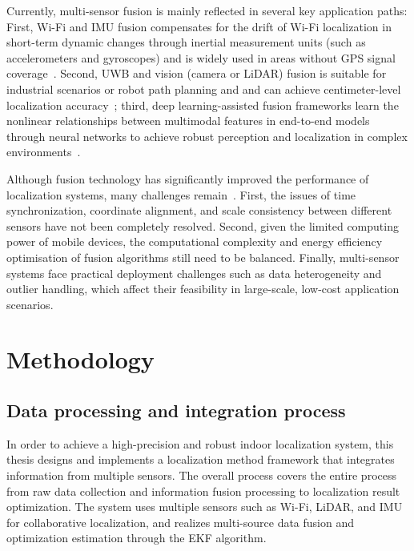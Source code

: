\documentclass[12pt,a4paper]{article}
\numberwithin{equation}{section}
\begin{document}
Currently, multi-sensor fusion is mainly reflected in several key application
paths: First, Wi-Fi and IMU fusion compensates for the drift of Wi-Fi
localization in short-term dynamic changes through inertial measurement units
(such as accelerometers and gyroscopes) and is widely used in areas without GPS
signal coverage~\cite{liu2019fusion}. Second, UWB and vision (camera or LiDAR)
fusion is suitable for industrial scenarios or robot path planning and and can
achieve centimeter-level localization accuracy~\cite{gu2020fusion}; third, deep
learning-assisted fusion frameworks learn the nonlinear relationships between
multimodal features in end-to-end models through neural networks to achieve
robust perception and localization in complex environments~\cite{zhou2022deep}.

Although fusion technology has significantly improved the performance of
localization systems, many challenges remain~\cite{zafari2019survey}. First, the
issues of time synchronization, coordinate alignment, and scale consistency
between different sensors have not been completely resolved. Second, given the
limited computing power of mobile devices, the computational complexity and
energy efficiency optimisation of fusion algorithms still need to be
balanced. Finally, multi-sensor systems face practical deployment challenges
such as data heterogeneity and outlier handling, which affect their feasibility
in large-scale, low-cost application scenarios.


\newpage
\section{Methodology}
\label{sec:methodology}
\subsection{Data processing and integration process}
In order to achieve a high-precision and robust indoor localization system, this
thesis designs and implements a localization method framework that integrates
information from multiple sensors. The overall process covers the entire process
from raw data collection and information fusion processing to localization
result optimization. The system uses multiple sensors such as Wi-Fi, LiDAR, and
IMU for collaborative localization, and realizes multi-source data fusion and
optimization estimation through the EKF algorithm.
\end{document}
